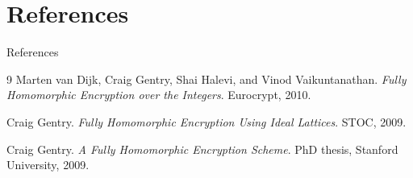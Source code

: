 \documentclass[10pt, aspectratio=169]{beamer}
\begin{document}
\section{References}
\begin{frame}{References}
    \begin{thebibliography}{9}
        Marten van Dijk, Craig Gentry, Shai Halevi, and Vinod Vaikuntanathan.
        \textit{Fully Homomorphic Encryption over the Integers}. 
        Eurocrypt, 2010.
        
        Craig Gentry.
        \textit{Fully Homomorphic Encryption Using Ideal Lattices}.
        STOC, 2009.
        
        Craig Gentry.
        \textit{A Fully Homomorphic Encryption Scheme}.
        PhD thesis, Stanford University, 2009.
    \end{thebibliography}
\end{frame}
\end{document}
